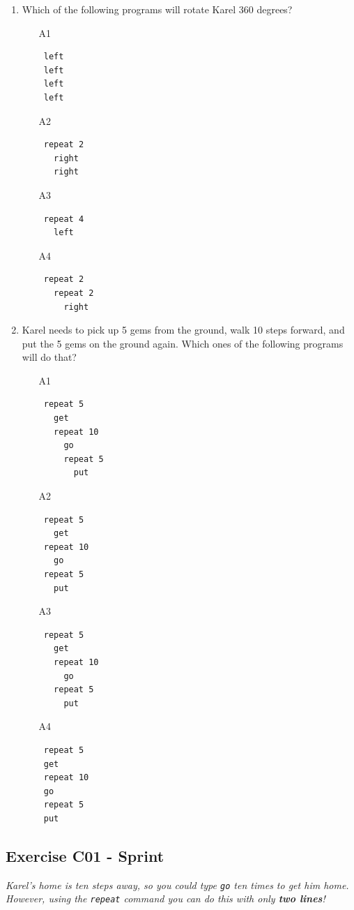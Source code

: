 \documentclass[article,A4,12pt]{llncs}
\begin{document}
{{\begin{enumerate}
\item Which of the following programs will rotate Karel 360 degrees?
\begin{enumerate}
\item[A1] 
\begin{verbatim}
 left
 left
 left
 left
\end{verbatim}
\item[A2] 
\begin{verbatim}
 repeat 2
   right
   right
\end{verbatim}
\item[A3] 
\begin{verbatim}
 repeat 4
   left
\end{verbatim}
\item[A4] 
\begin{verbatim}
 repeat 2
   repeat 2
     right
\end{verbatim}
\end{enumerate}
\item Karel needs to pick up 5 gems from the ground, walk 10 steps forward, and put the 5 gems 
      on the ground again. Which ones of the following programs will do that?
\begin{enumerate}
\item[A1] 
\begin{verbatim}
 repeat 5
   get
   repeat 10
     go
     repeat 5
       put
\end{verbatim}
\item[A2] 
\begin{verbatim}
 repeat 5
   get
 repeat 10
   go
 repeat 5
   put
\end{verbatim}
\item[A3] 
\begin{verbatim}
 repeat 5
   get
   repeat 10
     go
   repeat 5
     put
\end{verbatim}
\item[A4] 
\begin{verbatim}
 repeat 5
 get
 repeat 10
 go
 repeat 5
 put
\end{verbatim}
\end{enumerate}
\end{enumerate}

\subsection{Exercise C01 - Sprint}

{\em Karel's home is ten steps away, so you could type {\tt go} ten times to get him home. However, using the {\tt repeat} command you can do this with only {\bf two lines}! 

}}}
\end{document}

